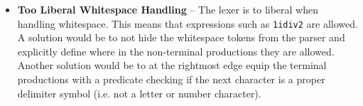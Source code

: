 \begin{itemize}
\item \textbf{Too Liberal Whitespace Handling} -- The lexer is to liberal when handling whitespace. This means that expressions such as \verb!1idiv2! are allowed. A solution would be to not hide the whitespace tokens from the parser and explicitly define where in the non-terminal productions they are allowed. Another solution would be to at the rightmost edge equip the terminal productions with a predicate checking if the next character is a proper delimiter symbol (i.e. not a letter or number character).

\end{itemize}

